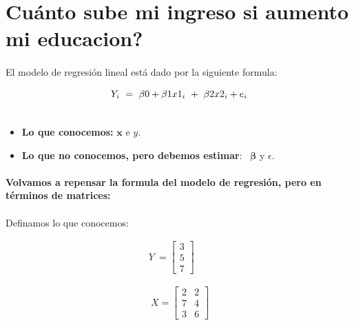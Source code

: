 \documentclass[10pt]{article}
\begin{document}
\section{Cu\'anto sube mi ingreso si aumento mi educacion? }

\paragraph{}El modelo de regresi\'on lineal est\'a dado por la siguiente formula:


\begin{center}

\begin{gather}
Y_{i} \ =\ \beta 0+\beta 1x1_{i} \ +\ \beta 2x2_{i} +e_{i} \notag\\
 \notag
\end{gather}
\end{center}




\begin{itemize}
\item \textbf{Lo que conocemos:} $\displaystyle {\boldsymbol x}$ e $\displaystyle y$. 
\item \textbf{Lo que no conocemos, pero debemos estimar}: \ $\displaystyle \boldsymbol{\beta} $ y $\displaystyle \epsilon $.
\end{itemize}



\paragraph{}{\Large \textbf{Volvamos a repensar la formula del modelo de regresi\'on, pero en t\'erminos de matrices:}}



\paragraph{}Definamos lo que conocemos:


\begin{gather*}
Y\ =\begin{bmatrix}
3\\
5\\
7
\end{bmatrix}\\
\\
\\
\ X=\begin{bmatrix}
2 & 2\\
7 & 4\\
3 & 6
\end{bmatrix}
\end{gather*}
\begin{equation*}
\end{equation*}
\end{document}
